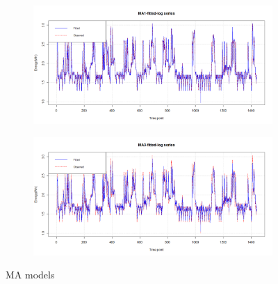 \documentclass[12pt]{article}
\begin{document}
\begin{figure}[H]
  \centering
  \begin{subfigure}[b]{0.9\linewidth}
    \includegraphics[width=\linewidth]{figure9-3.png}
  \end{subfigure}
  \begin{subfigure}[b]{0.9\linewidth}
    \includegraphics[width=\linewidth]{figure9-4.png}
  \end{subfigure}
  \caption{MA models}
  \label{fig:figure10}
\end{figure}
\end{document}

